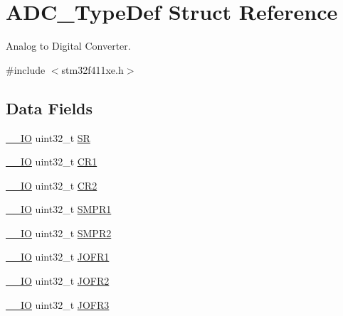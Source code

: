 \hypertarget{struct_a_d_c___type_def}{}\section{A\+D\+C\+\_\+\+Type\+Def Struct Reference}
\label{struct_a_d_c___type_def}


Analog to Digital Converter.  




{\ttfamily \#include $<$stm32f411xe.\+h$>$}

\subsection*{Data Fields}
\begin{DoxyCompactItemize}
\item 
\hyperlink{core__sc300_8h_aec43007d9998a0a0e01faede4133d6be}{\+\_\+\+\_\+\+IO} uint32\+\_\+t \hyperlink{struct_a_d_c___type_def_a9745df96e98f3cdc2d05ccefce681f64}{SR}
\item 
\hyperlink{core__sc300_8h_aec43007d9998a0a0e01faede4133d6be}{\+\_\+\+\_\+\+IO} uint32\+\_\+t \hyperlink{struct_a_d_c___type_def_a89b1ff4376683dd2896ea8b32ded05b2}{C\+R1}
\item 
\hyperlink{core__sc300_8h_aec43007d9998a0a0e01faede4133d6be}{\+\_\+\+\_\+\+IO} uint32\+\_\+t \hyperlink{struct_a_d_c___type_def_a1053a65a21af0d27afe1bf9cf7b7aca7}{C\+R2}
\item 
\hyperlink{core__sc300_8h_aec43007d9998a0a0e01faede4133d6be}{\+\_\+\+\_\+\+IO} uint32\+\_\+t \hyperlink{struct_a_d_c___type_def_a73009a8122fcc628f467a4e997109347}{S\+M\+P\+R1}
\item 
\hyperlink{core__sc300_8h_aec43007d9998a0a0e01faede4133d6be}{\+\_\+\+\_\+\+IO} uint32\+\_\+t \hyperlink{struct_a_d_c___type_def_a9e68fe36c4c8fbbac294b5496ccf7130}{S\+M\+P\+R2}
\item 
\hyperlink{core__sc300_8h_aec43007d9998a0a0e01faede4133d6be}{\+\_\+\+\_\+\+IO} uint32\+\_\+t \hyperlink{struct_a_d_c___type_def_aa005e656f528aaad28d70d61c9db9b81}{J\+O\+F\+R1}
\item 
\hyperlink{core__sc300_8h_aec43007d9998a0a0e01faede4133d6be}{\+\_\+\+\_\+\+IO} uint32\+\_\+t \hyperlink{struct_a_d_c___type_def_aa20f76044c11042dde41c1060853fb82}{J\+O\+F\+R2}
\item 
\hyperlink{core__sc300_8h_aec43007d9998a0a0e01faede4133d6be}{\+\_\+\+\_\+\+IO} uint32\+\_\+t \hyperlink{struct_a_d_c___type_def_ae9c78142f6edf8122384263878d09015}{J\+O\+F\+R3}

\end{DoxyCompactItemize}
